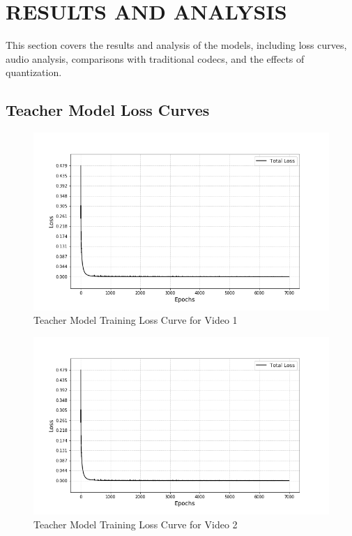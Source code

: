 \section{\MakeUppercase{Results and Analysis}}
This section covers the results and analysis of the models, including loss curves, audio analysis, comparisons with traditional codecs, and the effects of quantization.

\subsection{Teacher Model Loss Curves}

\begin{figure}[H]
    \centering
    \includegraphics[height=0.6\linewidth]{assets/audio_video_loss_curves/video1_loss.png}
    \caption{Teacher Model Training Loss Curve for Video 1}
    \label{fig:video-loss-curve-1}
\end{figure}

\begin{figure}[H]
    \centering
    \includegraphics[height=0.6\linewidth]{assets/audio_video_loss_curves/video1_loss.png}
    \caption{Teacher Model Training Loss Curve for Video 2}
    \label{fig:video-loss-curve-2}
\end{figure}

